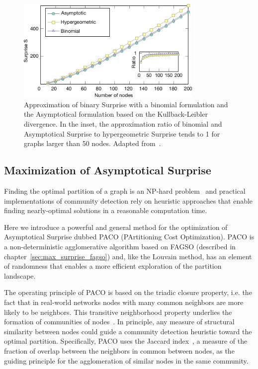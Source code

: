 \begin{figure}[htb!]
\centering
\includegraphics[width=0.8\textwidth]{images/asymptotical_surprise_comparison.pdf}
\caption{Approximation of binary Surprise with a binomial formulation and the Asymptotical formulation based on the Kullback-Leibler divergence. In the inset, the approximation ratio of binomial and Asymptotical Surprise to hypergeometric Surprise tends to 1 for graphs larger than 50 nodes. Adapted from~\cite{traag2015}.}
\label{fig:asymptotical_surprise_comparison}
\end{figure}


\subsection{Maximization of Asymptotical Surprise}
Finding the optimal partition of a graph is an NP-hard problem~\cite{fortunato2010} and practical implementations of community detection rely on heuristic approaches that enable finding nearly-optimal solutions in a reasonable computation time.

Here we introduce a powerful and general method for the optimization of Asymptotical Surprise dubbed PACO (PArtitioning Cost Optimization). PACO is a non-deterministic agglomerative algorithm based on FAGSO (described in chapter~\ref{sec:max_surprise_fagso}) and, like the Louvain method, has an element of randomness that enables a more efficient exploration of the partition landscape.

The operating principle of PACO is based on the triadic closure property, i.e. the fact that in real-world networks nodes with many common neighbors are more likely to be neighbors. This transitive neighborhood property underlies the formation of communities of nodes~\cite{bianconi2014,eustace2015}. In principle, any measure of structural similarity between nodes could guide a community detection heuristic toward the optimal partition. Specifically, PACO uses the Jaccard index~\cite{jaccard1901}, a measure of the fraction of overlap between the neighbors in common between nodes, as the guiding principle for the agglomeration of similar nodes in the same community.

